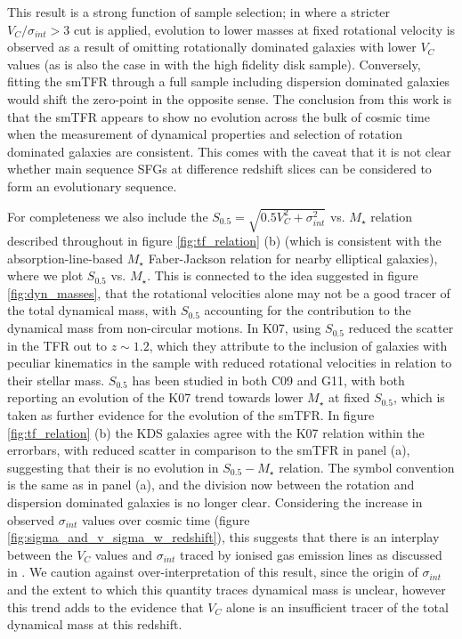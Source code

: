 \documentclass[fleqn,usenatbib]{mn2e}
\begin{document}
This result is a strong function of sample selection; in \cite{Tiley2016a} where a stricter $V_{C}/\sigma_{int} > 3$ cut is applied, evolution to lower masses at fixed rotational velocity is observed as a result of omitting rotationally dominated galaxies with lower $V_{C}$ values (as is also the case in \cite{Cresci2009} with the high fidelity disk sample).
Conversely, fitting the smTFR through a full sample including dispersion dominated galaxies would shift the zero-point in the opposite sense.
The conclusion from this work is that the smTFR appears to show no evolution across the bulk of cosmic time when the measurement of dynamical properties and selection of rotation dominated galaxies are consistent.
This comes with the caveat that it is not clear whether main sequence SFGs at difference redshift slices can be considered to form an evolutionary sequence.

For completeness we also include the $S_{0.5} = \sqrt{0.5V_{C}^{2} + \sigma_{int}^{2}}$ vs. $M_{\star}$ relation described throughout \cite[K07][]{Kassin2007} in figure \ref{fig:tf_relation} (b) (which is consistent with the absorption-line-based $M_{\star}$ Faber-Jackson relation for nearby elliptical galaxies), where we plot $S_{0.5}$ vs. $M_{\star}$. 
This is connected to the idea suggested in figure \ref{fig:dyn_masses}, that the rotational velocities alone may not be a good tracer of the total dynamical mass, with $S_{0.5}$ accounting for the contribution to the dynamical mass from non-circular motions.
In K07, using $S_{0.5}$ reduced the scatter in the TFR out to $z\sim1.2$, which they attribute to the inclusion of galaxies with peculiar kinematics in the sample with reduced rotational velocities in relation to their stellar mass.
$S_{0.5}$ has been studied in both C09 and G11, with both reporting an evolution of the K07 trend towards lower $M_{\star}$ at fixed $S_{0.5}$, which is taken as further evidence for the evolution of the smTFR.
In figure \ref{fig:tf_relation} (b) the KDS galaxies agree with the K07 relation within the errorbars, with reduced scatter in comparison to the smTFR in panel (a), suggesting that their is no evolution in $S_{0.5}-M_{\star}$ relation.
The symbol convention is the same as in panel (a), and the division now between the rotation and dispersion dominated galaxies is no longer clear. 
Considering the increase in observed $\sigma_{int}$ values over cosmic time (figure \ref{fig:sigma_and_v_sigma_w_redshift}), this suggests that there is an interplay between the $V_{C}$ values and $\sigma_{int}$ traced by ionised gas emission lines as discussed in \cite{Kassin2012}. 
We caution against over-interpretation of this result, since the origin of $\sigma_{int}$ and the extent to which this quantity traces dynamical mass is unclear, however this trend adds to the evidence that $V_{C}$ alone is an insufficient tracer of the total dynamical mass at this redshift. 
\end{document}
